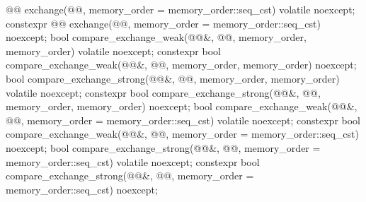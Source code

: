 \begin{codeblock}
{{    @@ exchange(@@,
                                 memory_order = memory_order::seq_cst) volatile noexcept;
    constexpr @@ exchange(@@,
                                           memory_order = memory_order::seq_cst) noexcept;
    bool compare_exchange_weak(@@&, @@,
                               memory_order, memory_order) volatile noexcept;
    constexpr bool compare_exchange_weak(@@&, @@,
                                         memory_order, memory_order) noexcept;
    bool compare_exchange_strong(@@&, @@,
                                 memory_order, memory_order) volatile noexcept;
    constexpr bool compare_exchange_strong(@@&, @@,
                                           memory_order, memory_order) noexcept;
    bool compare_exchange_weak(@@&, @@,
                               memory_order = memory_order::seq_cst) volatile noexcept;
    constexpr bool compare_exchange_weak(@@&, @@,
                                         memory_order = memory_order::seq_cst) noexcept;
    bool compare_exchange_strong(@@&, @@,
                                 memory_order = memory_order::seq_cst) volatile noexcept;
    constexpr bool compare_exchange_strong(@@&, @@,
                                           memory_order = memory_order::seq_cst) noexcept;

}}
\end{codeblock}
